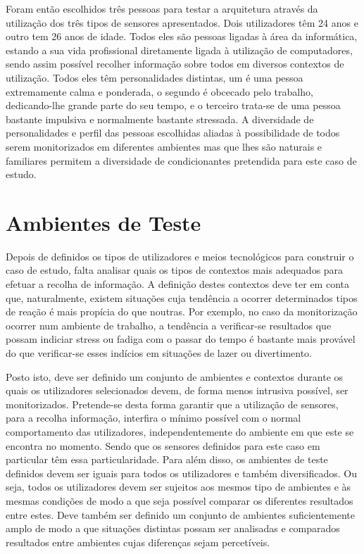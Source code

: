 Foram então escolhidos três pessoas para testar a arquitetura através da utilização dos três tipos de sensores apresentados. Dois utilizadores têm 24 anos e outro tem 26 anos de idade. Todos eles são pessoas ligadas à área da informática, estando a sua vida profissional diretamente ligada à utilização de computadores, sendo assim possível recolher informação sobre todos em diversos contextos de utilização. Todos eles têm personalidades distintas, um é uma pessoa extremamente calma e ponderada, o segundo é obcecado pelo trabalho, dedicando-lhe grande parte do seu tempo, e o terceiro trata-se de uma pessoa bastante impulsiva e normalmente bastante stressada. A diversidade de personalidades e perfil das pessoas escolhidas aliadas à possibilidade de todos serem monitorizados em diferentes ambientes mas que lhes são naturais e familiares permitem a diversidade de condicionantes pretendida para este caso de estudo.


\section{Ambientes de Teste}

Depois de definidos os tipos de utilizadores e meios tecnológicos para construir o caso de estudo, falta analisar quais os tipos de contextos mais adequados para efetuar a recolha de informação. A definição destes contextos deve ter em conta que, naturalmente, existem situações cuja tendência a ocorrer determinados tipos de reação é mais propícia do que noutras. Por exemplo, no caso da monitorização ocorrer num ambiente de trabalho, a tendência a verificar-se resultados que possam indiciar stress ou fadiga com o passar do tempo é bastante mais provável do que verificar-se esses indícios em situações de lazer ou divertimento.

Posto isto, deve ser definido um conjunto de ambientes e contextos durante os quais os utilizadores selecionados devem, de forma menos intrusiva possível, ser monitorizados. Pretende-se desta forma garantir que a utilização de sensores, para a recolha informação, interfira o mínimo possível com o normal comportamento das utilizadores, independentemente do ambiente em que este se encontra no momento. Sendo que os sensores definidos para este caso em particular têm essa particularidade. Para além disso, os ambientes de teste definidos devem ser iguais para todos os utilizadores e também diversificados. Ou seja, todos os utilizadores devem ser sujeitos aos mesmos tipo de ambientes e às mesmas condições de modo a que seja possível comparar os diferentes resultados entre estes. Deve também ser definido um conjunto de ambientes suficientemente amplo de modo a que situações distintas possam ser analisadas e comparados resultados entre ambientes cujas diferenças sejam percetíveis.

